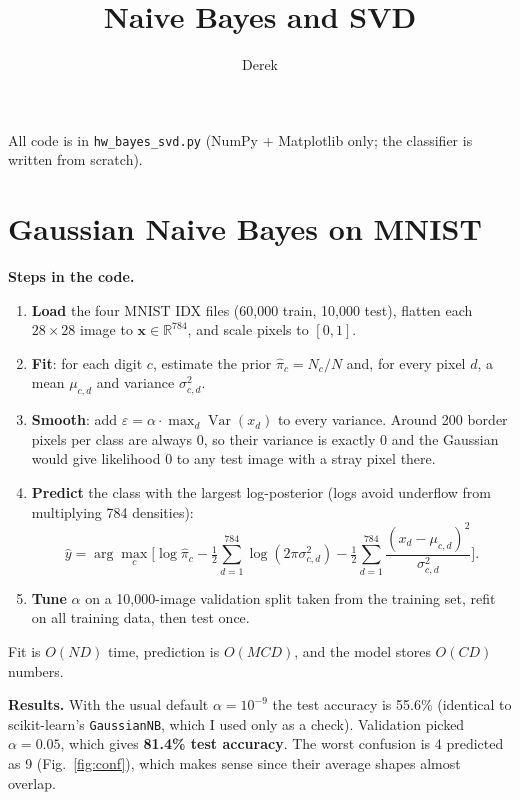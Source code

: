 \documentclass[11pt]{article}
\title{\vspace{-2em}Naive Bayes and SVD}
\author{Derek}
\date{}
\begin{document}
\maketitle
\vspace{-3em}

All code is in \texttt{hw\_bayes\_svd.py} (NumPy + Matplotlib only; the classifier is written from scratch).

\section{Gaussian Naive Bayes on MNIST}

\textbf{Steps in the code.}
\begin{enumerate}
  \item \textbf{Load} the four MNIST IDX files (60{,}000 train, 10{,}000 test), flatten each $28\times28$ image to $\mathbf{x}\in\mathbb{R}^{784}$, and scale pixels to $[0,1]$.
  \item \textbf{Fit}: for each digit $c$, estimate the prior $\hat\pi_c = N_c/N$ and, for every pixel $d$, a mean $\mu_{c,d}$ and variance $\sigma^2_{c,d}$.
  \item \textbf{Smooth}: add $\varepsilon = \alpha\cdot\max_d \operatorname{Var}(x_d)$ to every variance. Around 200 border pixels per class are always 0, so their variance is exactly 0 and the Gaussian would give likelihood 0 to any test image with a stray pixel there.
  \item \textbf{Predict} the class with the largest log-posterior (logs avoid underflow from multiplying 784 densities):
  \[
    \hat y = \arg\max_c \Big[\log\hat\pi_c - \tfrac12\sum_{d=1}^{784}\log(2\pi\sigma^2_{c,d}) - \tfrac12\sum_{d=1}^{784}\frac{(x_d-\mu_{c,d})^2}{\sigma^2_{c,d}}\Big].
  \]
  \item \textbf{Tune} $\alpha$ on a 10{,}000-image validation split taken from the training set, refit on all training data, then test once.
\end{enumerate}
Fit is $O(ND)$ time, prediction is $O(MCD)$, and the model stores $O(CD)$ numbers.

\textbf{Results.} With the usual default $\alpha=10^{-9}$ the test accuracy is 55.6\% (identical to scikit-learn's \texttt{GaussianNB}, which I used only as a check). Validation picked $\alpha=0.05$, which gives \textbf{81.4\% test accuracy}. The worst confusion is 4 predicted as 9 (Fig.~\ref{fig:conf}), which makes sense since their average shapes almost overlap.
\end{document}
